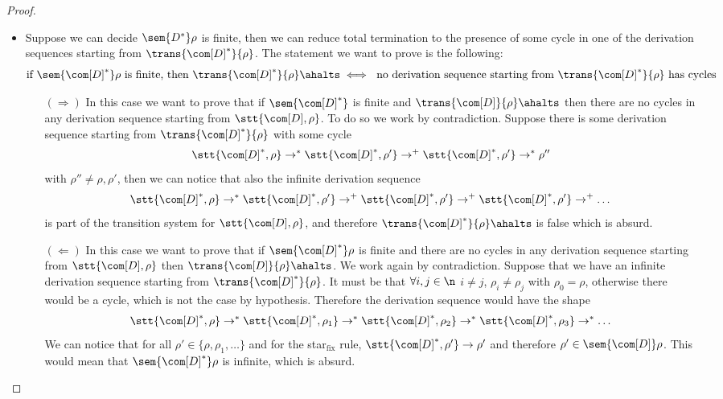 \begin{proof}
\begin{itemize}
  \item Suppose we can decide \(\sem{D^*}\rho\) is finite, then we can
    reduce total termination to the presence of some cycle in one of
    the derivation sequences starting from
    \(\trans{\com[D]^*}{\rho}\). The statement we want to prove is the
    following:
    \begin{equation*}
      \text{if }\sem{\com[D]^*}\rho \text{ is finite, then } \trans{\com[D]^*}{\rho} \ahalts \iff \text{ no derivation sequence starting from } \trans{\com[D]^*}{\rho} \text{ has cycles}
    \end{equation*}
    \begin{itemize}
    \item[\((\Rightarrow)\)] In this case we want to prove that if
      \(\sem{\com[D]^*}\) is finite and
      \(\trans{\com[D]}{\rho} \ahalts\) then there are no cycles in
      any derivation sequence starting from \(\stt{\com[D],
        \rho}\). To do so we work by contradiction. Suppose there is
      some derivation sequence starting from
      \(\trans{\com[D]^*}{\rho}\) with some cycle
      \begin{equation*}
        \stt{\com[D]^*, \rho} \to^* \stt{\com[D]^*, \rho'} \to^+ \stt{\com[D]^*, \rho'} \to^* \rho''
      \end{equation*}
      with \(\rho''\neq \rho, \rho'\), then we can notice that also
      the infinite derivation sequence
      \begin{equation*}
        \stt{\com[D]^*, \rho} \to^* \stt{\com[D]^*, \rho'} \to^+ \stt{\com[D]^*, \rho'} \to^+ \stt{\com[D]^*, \rho'} \to^+ \dots
      \end{equation*}
      is part of the transition system for \(\stt{\com[D], \rho}\),
      and therefore \(\trans{\com[D]^*}{\rho} \ahalts\) is false which
      is absurd.
    \item[\((\Leftarrow)\)] In this case we want to prove that if
      \(\sem{\com[D]^*}\rho\) is finite and there are no cycles in any
      derivation sequence starting from \(\stt{\com[D], \rho}\) then
      \(\trans{\com[D]}{\rho} \ahalts\). We work again by
      contradiction. Suppose that we have an infinite derivation
      sequence starting from \(\trans{\com[D]^*}{\rho}\). It must be
      that \(\forall i,j \in \n\) \(i \neq j\), \(\rho_i \neq \rho_j\)
      with \(\rho_0 = \rho\), otherwise there would be a cycle, which
      is not the case by hypothesis. Therefore the derivation sequence
      would have the shape
      \begin{equation*}
        \stt{\com[D]^*, \rho} \to^* \stt{\com[D]^*, \rho_1} \to^* \stt{\com[D]^*, \rho_2} \to^* \stt{\com[D]^*, \rho_3} \to^* \dots
      \end{equation*}
      We can notice that for all \(\rho' \in \{\rho, \rho_1, \dots\}\)
      and for the star\(_{\text{fix}}\) rule,
      \(\stt{\com[D]^*, \rho'} \to \rho'\) and therefore
      \(\rho'\in \sem{\com[D]}\rho\). This would mean that
      \(\sem{\com[D]^*}\rho\) is infinite, which is absurd.
    \end{itemize}
  \end{itemize}
\end{proof}
